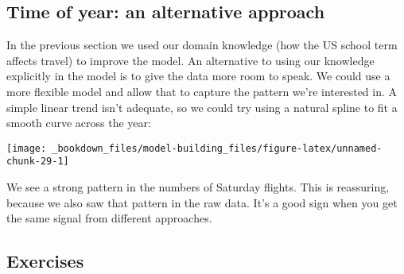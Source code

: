 \documentclass[]{book}
\newenvironment{Shaded}{\begin{snugshade}}{\end{snugshade}}
\newcommand{\KeywordTok}[1]{\textcolor[rgb]{0.13,0.29,0.53}{\textbf{{#1}}}}
\newcommand{\DataTypeTok}[1]{\textcolor[rgb]{0.13,0.29,0.53}{{#1}}}
\newcommand{\DecValTok}[1]{\textcolor[rgb]{0.00,0.00,0.81}{{#1}}}
\newcommand{\StringTok}[1]{\textcolor[rgb]{0.31,0.60,0.02}{{#1}}}
\newcommand{\NormalTok}[1]{{#1}}
\begin{document}
\subsection{Time of year: an alternative
approach}\label{time-of-year-an-alternative-approach}

In the previous section we used our domain knowledge (how the US school
term affects travel) to improve the model. An alternative to using our
knowledge explicitly in the model is to give the data more room to
speak. We could use a more flexible model and allow that to capture the
pattern we're interested in. A simple linear trend isn't adequate, so we
could try using a natural spline to fit a smooth curve across the year:

\begin{Shaded}
\end{Shaded}

\begin{center}\texttt{[image: \_bookdown\_files/model-building\_files/figure-latex/unnamed-chunk-29-1]} \end{center}

We see a strong pattern in the numbers of Saturday flights. This is
reassuring, because we also saw that pattern in the raw data. It's a
good sign when you get the same signal from different approaches.

\subsection{Exercises}\label{exercises-64}
\end{document}
